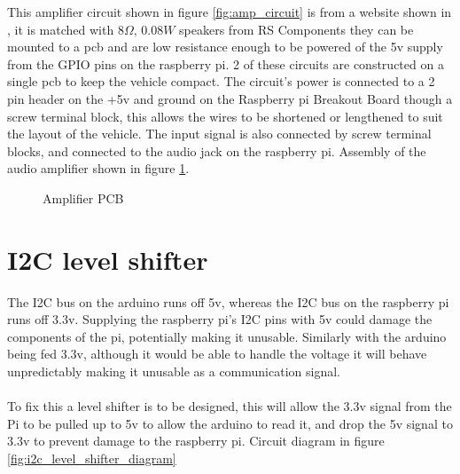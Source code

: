 This amplifier circuit shown in figure \ref{fig:amp_circuit} is from a website shown in \cite{amp_circuit}, it is matched with $8 \Omega, \, 0.08W$ speakers from RS Components \cite{speakers} they can be mounted to a pcb and are low resistance enough to be powered of the 5v supply from the GPIO pins on the raspberry pi. 2 of these circuits are constructed on a single pcb to keep the vehicle compact. The circuit's power is connected to a 2 pin header on the +5v and ground on the Raspberry pi Breakout Board though a screw terminal block, this allows the wires to be shortened or lengthened to suit the layout of the vehicle. The input signal is also connected by screw terminal blocks, and connected to the audio jack on the raspberry pi. Assembly of the audio amplifier shown in figure \ref{fig:amplifyer_pcb}. 

\begin{figure}[h]%
    \centering
    \qquad
    \caption{Amplifier PCB}%
    \label{fig:amplifyer_pcb}%
\end{figure}

	\section{I2C level shifter}
	
The I2C bus on the arduino runs off 5v, whereas the I2C bus on the raspberry pi runs off 3.3v. Supplying the raspberry pi's I2C pins with 5v could damage the components of the pi, potentially making it unusable. Similarly with the arduino being fed 3.3v, although it would be able to handle the voltage it will behave unpredictably making it unusable as a communication signal.\\ \\
To fix this a level shifter is to be designed, this will allow the 3.3v signal from the Pi to be pulled up to 5v to allow the arduino to read it, and drop the 5v signal to 3.3v to prevent damage to the raspberry pi. Circuit diagram in figure \ref{fig:i2c_level_shifter_diagram}

